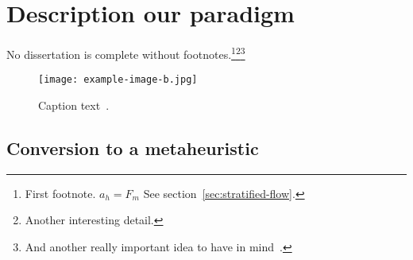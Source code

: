 
\section{Description our paradigm}\label{ch1:theidea}

\lipsum[8] No dissertation is complete without footnotes.\footnote{First footnote. $a_h = F_m$ See section~\ref{sec:stratified-flow}.}\footnote{Another interesting detail.}\footnote{And another really important idea to have in mind~\cite{reynolds1958,clauser56,lienhard2020,johnson1980,johnson1965,mpl}.} 

\begin{figure}[t]
\centering\texttt{[image: example-image-b.jpg]} 
\caption{Caption text\label{example-image-b}~\cite{GSL}.}
\end{figure}


\subsection{Conversion to a metaheuristic}

